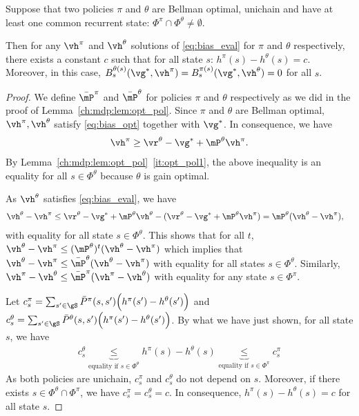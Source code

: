 \begin{lem}
    \label{ch:mdp:lem:equi_bias}
    Suppose that two policies $\pi$ and $\theta$ are Bellman optimal, unichain and have at least one common recurrent state: $\Phi^\pi\cap\Phi^\theta\neq\emptyset$.
    
    Then for any $\vh^\pi$ and $\vh^\theta$ solutions of \eqref{eq:bias_eval} for $\pi$ and $\theta$ respectively, there exists a constant $c$ such that for all state $s$: $h^\pi(s) -h^\theta(s) =c$. Moreover, in this case, ${B_s^{\theta(s)}(\vg^*, \vh^\pi)=B_s^{\pi(s)}(\vg^*, \vh^\theta)=0}$ for all $s$.
\end{lem}
\begin{proof}
    We define $\bar{\mP}^\pi$ and $\bar{\mP}^\theta$ for policies $\pi$ and $\theta$ respectively as we did in the proof of Lemma~\ref{ch:mdp:lem:opt_pol}.
    Since $\pi$ and $\theta$ are Bellman optimal, $\vh^\pi,\vh^\theta$ satisfy \eqref{eq:bias_opt} together with $\vg^*$.
    In consequence, we have
    \begin{align*}
        \vh^\pi \ge \vr^\theta -\vg^* +\mP^\theta\vh^\pi.
    \end{align*}
    By Lemma~\ref{ch:mdp:lem:opt_pol}~\ref{it:opt_pol1}, the above inequality is an equality for all $s\in\Phi^\theta$ because $\theta$ is gain optimal.

    As $\vh^\theta$ satisfies \eqref{eq:bias_eval}, we have
    \begin{align*}
        \vh^\theta -\vh^\pi &\le \vr^\theta -\vg^* +\mP^\theta\vh^\theta -(\vr^\theta -\vg^* +\mP^\theta\vh^\pi) = \mP^\theta(\vh^\theta -\vh^\pi),
    \end{align*}
    with equality for all state $s\in\Phi^\theta$. This shows that for all $t$, $\vh^\theta -\vh^\pi\le (\mP^\theta)^t(\vh^\theta -\vh^\pi)$ which implies that $\vh^\theta -\vh^\pi\le \bar{\mP}^\theta(\vh^\theta -\vh^\pi)$ with equality for all states $s\in\Phi^\theta$. Similarly, $\vh^\pi -\vh^\theta \le \bar{\mP}^\pi(\vh^\pi -\vh^\theta)$ with equality for any state $s\in\Phi^\pi$.

    Let $c^\pi_s=\sum_{s'\in\gS}\bar{P}^\pi(s,s')\Big(h^\pi(s')-h^\theta(s')\Big)$ and $c^\theta_s=\sum_{s'\in\gS}\bar{P}^\theta(s,s')\Big(h^\pi(s')-h^\theta(s')\Big)$. By what we have just shown, for all state $s$, we have
    \begin{align*}
        c^\theta_s \underbrace{\le}_{\text{equality if $s\in\Phi^\theta$}} h^\pi(s)-h^\theta(s) \underbrace{\le}_{\text{equality if $s\in\Phi^\pi$}} c^\pi_s
    \end{align*}
    As both policies are unichain, $c^\pi_s$ and $c^\theta_s$ do not depend on $s$.
    Moreover, if there exists $s\in\Phi^\theta\cap\Phi^\pi$, we have $c^\pi_s=c^\theta_s = c$. In consequence,  $h^\pi(s)-h^\theta(s)=c$ for all state $s$. 
\end{proof}

